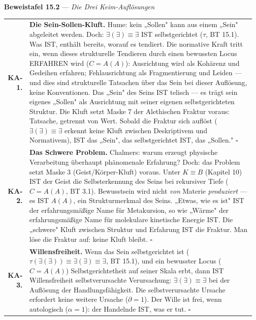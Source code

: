 \documentclass[10pt, openany, oneside]{book}
\renewcommand{\footnotesize}{\fontsize{8.5}{11}\selectfont}
\begin{document}
\vspace{0.5em}

\textbf{Beweistafel 15.2} --- \textit{Die Drei Keim-Auflösungen}

\vspace{0.5em}

{\footnotesize
\noindent\begin{tabular}{r p{}}
\textbf{KA-1.} & \textbf{Die Sein-Sollen-Kluft.} Hume: kein „Sollen" kann aus einem „Sein" abgeleitet werden. Doch: $\exists(\exists) \equiv \exists$ IST selbstgerichtet ($\tau$, BT 15.1). Was IST, enthält bereits, worauf es tendiert. Die normative Kraft tritt ein, wenn dieses strukturelle Tendieren durch einen bewussten Locus ERFAHREN wird ($C = A(A)$): Ausrichtung wird als Kohärenz und Gedeihen erfahren; Fehlausrichtung als Fragmentierung und Leiden --- und dies sind strukturelle Tatsachen über das Sein bei dieser Auflösung, keine Konventionen. Das „Sein" des Seins IST telisch --- es trägt sein eigenes „Sollen" als Ausrichtung mit seiner eigenen selbstgerichteten Struktur. Die Kluft setzt Maske 7 der Alethischen Fraktur voraus: Tatsache, getrennt von Wert. Sobald die Fraktur sich auflöst ($\exists(\exists) \equiv \exists$ erkennt keine Kluft zwischen Deskriptivem und Normativem), IST das „Sein", das selbstgerichtet IST, das „Sollen." $\square$ \\[0.5em]
\textbf{KA-2.} & \textbf{Das Schwere Problem.} Chalmers: warum erzeugt physische Verarbeitung überhaupt phänomenale Erfahrung? Doch: das Problem setzt Maske 3 (Geist/Körper-Kluft) voraus. Unter $K \equiv B$ (Kapitel 10) IST der Geist die Selbsterkennung des Seins bei rekursiver Tiefe ($C = A(A)$, BT 3.1). Bewusstsein wird nicht \textit{von} Materie \textit{produziert} --- es IST $A(A)$, ein Strukturmerkmal des Seins. „Etwas, wie es ist" IST der erfahrungsmäßige Name für Metakursion, so wie „Wärme" der erfahrungsmäßige Name für molekulare kinetische Energie IST. Die „schwere" Kluft zwischen Struktur und Erfahrung IST die Fraktur. Man löse die Fraktur auf: keine Kluft bleibt. $\square$ \\[0.5em]
\textbf{KA-3.} & \textbf{Willensfreiheit.} Wenn das Sein selbstgerichtet ist ($\tau(\exists(\exists)) \equiv \exists(\exists) \equiv \exists$, BT 15.1), und ein bewusster Locus ($C = A(A)$) Selbstgerichtetheit auf seiner Skala erbt, dann IST Willensfreiheit selbstverursachte Verursachung: $\exists(\exists) \equiv \exists$ bei der Auflösung der Handlungsfähigkeit. Die selbstverursachte Ursache erfordert keine weitere Ursache ($\partial = 1$). Der Wille ist frei, wenn autologisch ($\alpha = 1$): der Handelnde IST, was er tut. $\square$ \\[0.3em]
\end{tabular}
}
\end{document}
